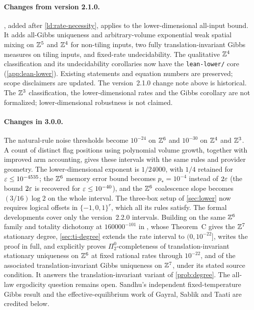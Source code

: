 \paragraph{Changes from version 2.1.0.}
, added after \cref{ld:rate-necessity}, applies \cite[Corollary~13.7]{DM26} to the lower-dimensional all-input bound. It adds all-Gibbs uniqueness and arbitrary-volume exponential weak spatial mixing on $\mathbb{Z}^5$ and $\mathbb{Z}^4$ for non-tiling inputs, two fully translation-invariant Gibbs measures on tiling inputs, and fixed-rate undecidability. The qualitative $\mathbb{Z}^4$ classification and its undecidability corollaries now have the \texttt{lean-lower/} core (\cref{app:lean-lower}). Existing statements and equation numbers are preserved; scope disclaimers are updated. The version~2.1.0 change note above is historical. The $\mathbb{Z}^3$ classification, the lower-dimensional rates and the Gibbs corollary are not formalized; lower-dimensional robustness is not claimed.

\paragraph{Changes in 3.0.0.}
The natural-rule noise thresholds become $10^{-24}$ on $\mathbb{Z}^6$ and $10^{-30}$ on $\mathbb{Z}^4$ and $\mathbb{Z}^3$. A count of distinct flag positions using polynomial volume growth, together with improved arm accounting, gives these intervals with the same rules and provider geometry. The lower-dimensional exponent is $1/24000$, with $1/4$ retained for $\varepsilon\le10^{-4535}$; the $\mathbb{Z}^6$ memory error bound becomes $p_*=10^{-4}$ instead of $2\varepsilon$ (the bound $2\varepsilon$ is recovered for $\varepsilon\le10^{-40}$), and the $\mathbb{Z}^6$ coalescence slope becomes $(3/16)\log2$ on the whole interval. The three-box setup of \cref{sec:lower} now requires logical offsets in $\{-1,0,1\}^r$, which all its rules satisfy. The formal developments cover only the version~2.2.0 intervals. Building on the same $\mathbb{Z}^6$ family and totality dichotomy at $160000^{-101}$ in \cite[Lemma~6.1]{DMrice}, whose Theorem~C gives the $\mathbb{Z}^7$ stationary degree, \cref{sec:ti-degree} extends the rate interval to $(0,10^{-22}]$, writes the proof in full, and explicitly proves $\Pi^0_2$-completeness of translation-invariant stationary uniqueness on $\mathbb{Z}^6$ at fixed rational rates through $10^{-22}$, and of the associated translation-invariant Gibbs uniqueness on $\mathbb{Z}^7$, under its stated source condition. It answers the translation-invariant variant of \cref{prob:degree}. The all-law ergodicity question remains open. Sandhu's independent fixed-temperature Gibbs result and the effective-equilibrium work of Gayral, Sablik and Taati are credited below.

